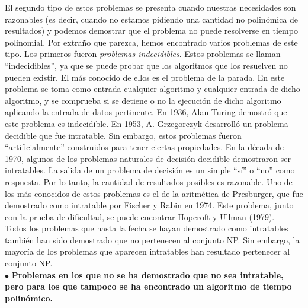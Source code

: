 El segundo tipo de estos problemas se presenta cuando nuestras necesidades son razonables (es decir, cuando no estamos pidiendo una cantidad no polinómica de resultados) y podemos demostrar que el problema no puede resolverse en tiempo polinomial. Por extraño que parezca, hemos encontrado varios problemas de este tipo. Los primeros fueron \emph{problemas indecidibles}. Estos problemas se llaman ``indecidibles'', ya que se puede probar que los algoritmos que los resuelven no pueden existir. El más conocido de ellos es el problema de la parada. En este problema se toma como entrada cualquier algoritmo y cualquier entrada de dicho algoritmo, y se comprueba si se detiene o no la ejecución de dicho algoritmo aplicando la entrada de datos pertinente. En 1936, Alan Turing demostró que este problema es indecidible. En 1953, A. Grzegorczyk desarrolló un problema decidible que fue intratable. Sin embargo, estos problemas fueron ``artificialmente'' construidos para tener ciertas propiedades. En la década de 1970, algunos de los problemas naturales de decisión decidible demostraron ser intratables. La salida de un problema de decisión es un simple ``sí'' o ``no'' como respuesta. Por lo tanto, la cantidad de resultados posibles es razonable. Uno de los más conocidos de estos problemas es el de la aritmética de Presburger, que fue demostrado como intratable por Fischer y Rabin en 1974. Este problema, junto con la prueba de dificultad, se puede encontrar Hopcroft y Ullman (1979).\\

Todos los problemas que hasta la fecha se hayan demostrado como intratables también han sido demostrado que no pertenecen al conjunto NP. Sin embargo, la mayoría de los problemas que aparecen intratables han resultado pertenecer al conjunto NP. \\

$\bullet$ \textbf{Problemas en los que no se ha demostrado que no sea intratable, pero para los que tampoco se ha encontrado un algoritmo de tiempo polinómico.}\\

